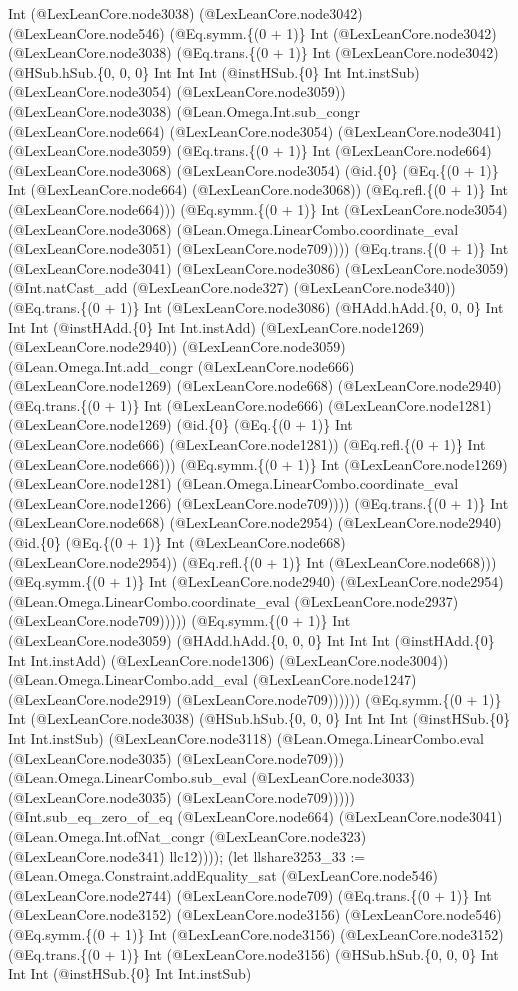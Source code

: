 \documentclass[11pt]{article}
\begin{document}
Int (@LexLeanCore.node3038) (@LexLeanCore.node3042) (@LexLeanCore.node546) (@Eq.symm.\{(0 + 1)\} Int (@LexLeanCore.node3042) (@LexLeanCore.node3038) (@Eq.trans.\{(0 + 1)\} Int (@LexLeanCore.node3042) (@HSub.hSub.\{0, 0, 0\} Int Int Int (@instHSub.\{0\} Int Int.instSub) (@LexLeanCore.node3054) (@LexLeanCore.node3059)) (@LexLeanCore.node3038) (@Lean.Omega.Int.sub\_congr (@LexLeanCore.node664) (@LexLeanCore.node3054) (@LexLeanCore.node3041) (@LexLeanCore.node3059) (@Eq.trans.\{(0 + 1)\} Int (@LexLeanCore.node664) (@LexLeanCore.node3068) (@LexLeanCore.node3054) (@id.\{0\} (@Eq.\{(0 + 1)\} Int (@LexLeanCore.node664) (@LexLeanCore.node3068)) (@Eq.refl.\{(0 + 1)\} Int (@LexLeanCore.node664))) (@Eq.symm.\{(0 + 1)\} Int (@LexLeanCore.node3054) (@LexLeanCore.node3068) (@Lean.Omega.LinearCombo.coordinate\_eval (@LexLeanCore.node3051) (@LexLeanCore.node709)))) (@Eq.trans.\{(0 + 1)\} Int (@LexLeanCore.node3041) (@LexLeanCore.node3086) (@LexLeanCore.node3059) (@Int.natCast\_add (@LexLeanCore.node327) (@LexLeanCore.node340)) (@Eq.trans.\{(0 + 1)\} Int (@LexLeanCore.node3086) (@HAdd.hAdd.\{0, 0, 0\} Int Int Int (@instHAdd.\{0\} Int Int.instAdd) (@LexLeanCore.node1269) (@LexLeanCore.node2940)) (@LexLeanCore.node3059) (@Lean.Omega.Int.add\_congr (@LexLeanCore.node666) (@LexLeanCore.node1269) (@LexLeanCore.node668) (@LexLeanCore.node2940) (@Eq.trans.\{(0 + 1)\} Int (@LexLeanCore.node666) (@LexLeanCore.node1281) (@LexLeanCore.node1269) (@id.\{0\} (@Eq.\{(0 + 1)\} Int (@LexLeanCore.node666) (@LexLeanCore.node1281)) (@Eq.refl.\{(0 + 1)\} Int (@LexLeanCore.node666))) (@Eq.symm.\{(0 + 1)\} Int (@LexLeanCore.node1269) (@LexLeanCore.node1281) (@Lean.Omega.LinearCombo.coordinate\_eval (@LexLeanCore.node1266) (@LexLeanCore.node709)))) (@Eq.trans.\{(0 + 1)\} Int (@LexLeanCore.node668) (@LexLeanCore.node2954) (@LexLeanCore.node2940) (@id.\{0\} (@Eq.\{(0 + 1)\} Int (@LexLeanCore.node668) (@LexLeanCore.node2954)) (@Eq.refl.\{(0 + 1)\} Int (@LexLeanCore.node668))) (@Eq.symm.\{(0 + 1)\} Int (@LexLeanCore.node2940) (@LexLeanCore.node2954) (@Lean.Omega.LinearCombo.coordinate\_eval (@LexLeanCore.node2937) (@LexLeanCore.node709))))) (@Eq.symm.\{(0 + 1)\} Int (@LexLeanCore.node3059) (@HAdd.hAdd.\{0, 0, 0\} Int Int Int (@instHAdd.\{0\} Int Int.instAdd) (@LexLeanCore.node1306) (@LexLeanCore.node3004)) (@Lean.Omega.LinearCombo.add\_eval (@LexLeanCore.node1247) (@LexLeanCore.node2919) (@LexLeanCore.node709)))))) (@Eq.symm.\{(0 + 1)\} Int (@LexLeanCore.node3038) (@HSub.hSub.\{0, 0, 0\} Int Int Int (@instHSub.\{0\} Int Int.instSub) (@LexLeanCore.node3118) (@Lean.Omega.LinearCombo.eval (@LexLeanCore.node3035) (@LexLeanCore.node709))) (@Lean.Omega.LinearCombo.sub\_eval (@LexLeanCore.node3033) (@LexLeanCore.node3035) (@LexLeanCore.node709))))) (@Int.sub\_eq\_zero\_of\_eq (@LexLeanCore.node664) (@LexLeanCore.node3041) (@Lean.Omega.Int.ofNat\_congr (@LexLeanCore.node323) (@LexLeanCore.node341) llc12)))); (let llshare3253\_33 := (@Lean.Omega.Constraint.addEquality\_sat (@LexLeanCore.node546) (@LexLeanCore.node2744) (@LexLeanCore.node709) (@Eq.trans.\{(0 + 1)\} Int (@LexLeanCore.node3152) (@LexLeanCore.node3156) (@LexLeanCore.node546) (@Eq.symm.\{(0 + 1)\} Int (@LexLeanCore.node3156) (@LexLeanCore.node3152) (@Eq.trans.\{(0 + 1)\} Int (@LexLeanCore.node3156) (@HSub.hSub.\{0, 0, 0\} Int Int Int (@instHSub.\{0\} Int Int.instSub) 
\end{document}
